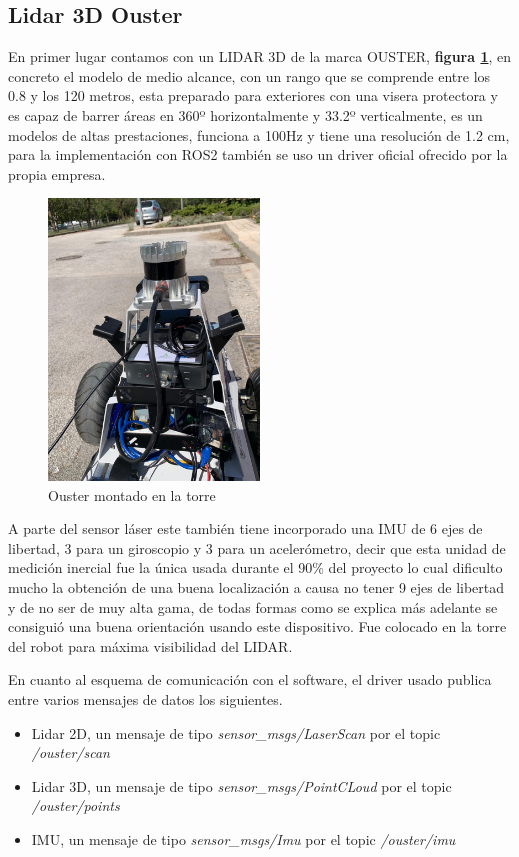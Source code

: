 \subsection{Lidar 3D Ouster}
En primer lugar contamos con un LIDAR 3D de la marca OUSTER, \textbf{figura \ref{fig:ouster_hunter}}, en concreto el 
modelo de medio alcance, con un rango que se comprende entre los 0.8 y los 120 metros, esta preparado para exteriores con una visera 
protectora y es capaz de barrer áreas en 360º horizontalmente y 33.2º verticalmente, es un modelos de altas prestaciones, funciona a 
100Hz y tiene una resolución de 1.2 cm, para la implementación con ROS2 también se uso un driver oficial ofrecido por la propia empresa. 

\begin{figure}[h]
    \centering
    \includegraphics[width=0.5\textwidth]{images/ouster_hunter.jpeg}
    \caption{Ouster montado en la torre}
    \label{fig:ouster_hunter}
\end{figure}

A parte del sensor láser este también tiene incorporado una IMU de 6 ejes de libertad, 3 para un giroscopio y 3 para un acelerómetro, 
decir que esta unidad de medición inercial fue la única usada durante el 90\% del proyecto lo cual dificulto mucho la obtención de una 
buena localización a causa no tener 9 ejes de libertad y de no ser de muy alta gama, de todas formas como se explica más adelante se 
consiguió una buena orientación usando este dispositivo. Fue colocado en la torre del robot para máxima visibilidad del LIDAR.

En cuanto al esquema de comunicación con el software, el driver usado publica entre varios mensajes de datos los siguientes.
\begin{itemize}
    \item Lidar 2D, un mensaje de tipo \textit{sensor\_msgs/LaserScan} por el topic \textit{/ouster/scan}
    \item Lidar 3D, un mensaje de tipo \textit{sensor\_msgs/PointCLoud} por el topic \textit{/ouster/points}
    \item IMU, un mensaje de tipo \textit{sensor\_msgs/Imu} por el topic \textit{/ouster/imu}
\end{itemize}

